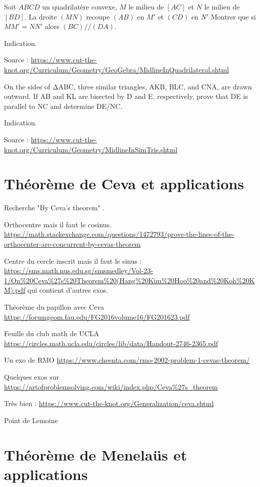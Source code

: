 \begin{exo}
Soit $ABCD$ un quadrilatère convexe, $M$ le milieu de $[AC]$ et $N$ le milieu de $[BD]$.
La droite $(MN)$ recoupe $(AB)$ en $M'$ et $(CD)$ en $N'$
Montrer que si $MM' = NN'$ alors $(BC)//(DA)$.
\begin{hint}
Indication.
\end{hint}
\begin{sol}
Source : \url{https://www.cut-the-knot.org/Curriculum/Geometry/GeoGebra/MidlineInQuadrilateral.shtml}
\end{sol}
\end{exo}

\begin{exo}
On the sides of ΔABC, three similar triangles, AKB, BLC, and CNA, are drawn outward. If AB and KL are bisected by D and E, respectively, prove that DE is parallel to NC and determine DE/NC.
\begin{hint}
Indication.
\end{hint}
\begin{sol}
Source : \url{https://www.cut-the-knot.org/Curriculum/Geometry/MidlineInSimTris.shtml}
\end{sol}
\end{exo}


\section{Théorème de Ceva et applications}

Recherche "By Ceva's theorem" .

Orthocentre mais il faut le cosinus. \url{https://math.stackexchange.com/questions/1472793/prove-the-lines-of-the-orthocenter-are-concurrent-by-cevas-theorem}

Centre du cercle inscrit mais il faut le sinus : \url{https://sms.math.nus.edu.sg/smsmedley/Vol-23-1/On%20Ceva%27s%20Theorem%20(Hang%20Kim%20Hoo%20and%20Koh%20KM).pdf} qui contient d'autres exos.

Théorème du papillon avec Ceva \url{https://forumgeom.fau.edu/FG2016volume16/FG201623.pdf}

Feuille du club math de UCLA \url{https://circles.math.ucla.edu/circles/lib/data/Handout-2746-2365.pdf}


Un exo de RMO \url{https://www.cheenta.com/rmo-2002-problem-1-cevas-theorem/}

Quelques exos sur \url{https://artofproblemsolving.com/wiki/index.php/Ceva%27s_theorem}

Très bien : \url{https://www.cut-the-knot.org/Generalization/ceva.shtml}

Point de Lemoine




\section{Théorème de Menelaüs et applications}





\indications
\correction



